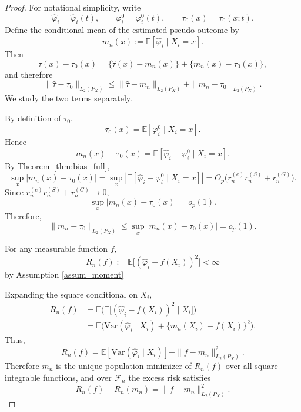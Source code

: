 \documentclass{article}
\newcommand{\Var}{\mathrm{Var}}
\newenvironment{proofof}[1]
{\renewcommand{\proofname}{Proof of #1}\begin{proof}}
{\end{proof}}
\begin{document}
\begin{proofof} {Theorem~\ref{thm:consistency_tailored}:}
    For notational simplicity, write
\[
\hat\varphi_i=\hat\varphi_i(t), \qquad \varphi_i^0=\varphi_i^0(t), \qquad \tau_0(x)=\tau_0(x;t).
\]
Define the conditional mean of the estimated pseudo-outcome by
\[
m_n(x):=\mathbb E[\hat\varphi_i\mid X_i=x].
\]
Then
\[
\hat\tau(x)-\tau_0(x)
=
\{\hat\tau(x)-m_n(x)\}+\{m_n(x)-\tau_0(x)\},
\]
and therefore
\begin{equation}\label{eq:l2_decomp}
\|\hat\tau-\tau_0\|_{L_2(P_X)}
\le
\|\hat\tau-m_n\|_{L_2(P_X)}
+
\|m_n-\tau_0\|_{L_2(P_X)}.
\end{equation}
We study the two terms separately.

 
By definition of \(\tau_0\),
\[
\tau_0(x)=\mathbb E[\varphi_i^0\mid X_i=x].
\]
Hence
\[
m_n(x)-\tau_0(x)
=
\mathbb E[\hat\varphi_i-\varphi_i^0\mid X_i=x].
\]
By Theorem~\ref{thm:bias_full},
\[
\sup_x |m_n(x)-\tau_0(x)|
=
\sup_x \left|\mathbb E[\hat\varphi_i-\varphi_i^0\mid X_i=x]\right|
=
O_p\!\big(r_n^{(e)}r_n^{(S)}+r_n^{(G)}\big).
\]
Since \(r_n^{(e)}r_n^{(S)}+r_n^{(G)}\to 0\),
\[
\sup_x |m_n(x)-\tau_0(x)|=o_p(1).
\]
Therefore,
\begin{equation}\label{eq:bias_to_zero}
\|m_n-\tau_0\|_{L_2(P_X)}
\le
\sup_x |m_n(x)-\tau_0(x)|
=
o_p(1).
\end{equation}

 
For any measurable function \(f\),
\[
R_n(f):=\mathbb E\big[(\hat\varphi_i-f(X_i))^2\big] <\infty
\]
by Assumption \ref{assum_moment}

Expanding the square conditional on \(X_i\),
\begin{align*}
R_n(f)
&=
\mathbb E\Big(
\mathbb E\big[(\hat\varphi_i-f(X_i))^2\mid X_i\big]
\Big)\\
&=
\mathbb E\Big(
\Var(\hat\varphi_i\mid X_i)
+
\{m_n(X_i)-f(X_i)\}^2
\Big).
\end{align*}
Thus,
\[
R_n(f)=\mathbb E[\Var(\hat\varphi_i\mid X_i)] + \|f-m_n\|_{L_2(P_X)}^2.
\]
Therefore \(m_n\) is the unique population minimizer of \(R_n(f)\) over all square-integrable functions, and over \(\mathcal F_n\) the excess risk satisfies
\begin{equation}\label{eq:excessriskidentity}
R_n(f)-R_n(m_n)=\|f-m_n\|_{L_2(P_X)}^2.
\end{equation}


\end{proofof}
\end{document}
